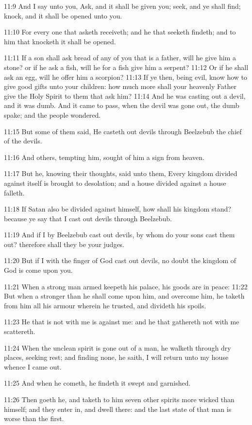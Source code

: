 11:9 And I say unto you, Ask, and it shall be given you; seek, and ye
shall find; knock, and it shall be opened unto you.

11:10 For every one that asketh receiveth; and he that seeketh
findeth; and to him that knocketh it shall be opened.

11:11 If a son shall ask bread of any of you that is a father, will he
give him a stone? or if he ask a fish, will he for a fish give him a
serpent?  11:12 Or if he shall ask an egg, will he offer him a
scorpion?  11:13 If ye then, being evil, know how to give good gifts
unto your children: how much more shall your heavenly Father give the
Holy Spirit to them that ask him?  11:14 And he was casting out a
devil, and it was dumb. And it came to pass, when the devil was gone
out, the dumb spake; and the people wondered.

11:15 But some of them said, He casteth out devils through Beelzebub
the chief of the devils.

11:16 And others, tempting him, sought of him a sign from heaven.

11:17 But he, knowing their thoughts, said unto them, Every kingdom
divided against itself is brought to desolation; and a house divided
against a house falleth.

11:18 If Satan also be divided against himself, how shall his kingdom
stand? because ye say that I cast out devils through Beelzebub.

11:19 And if I by Beelzebub cast out devils, by whom do your sons cast
them out? therefore shall they be your judges.

11:20 But if I with the finger of God cast out devils, no doubt the
kingdom of God is come upon you.

11:21 When a strong man armed keepeth his palace, his goods are in
peace: 11:22 But when a stronger than he shall come upon him, and
overcome him, he taketh from him all his armour wherein he trusted,
and divideth his spoils.

11:23 He that is not with me is against me: and he that gathereth not
with me scattereth.

11:24 When the unclean spirit is gone out of a man, he walketh through
dry places, seeking rest; and finding none, he saith, I will return
unto my house whence I came out.

11:25 And when he cometh, he findeth it swept and garnished.

11:26 Then goeth he, and taketh to him seven other spirits more wicked
than himself; and they enter in, and dwell there: and the last state
of that man is worse than the first.

